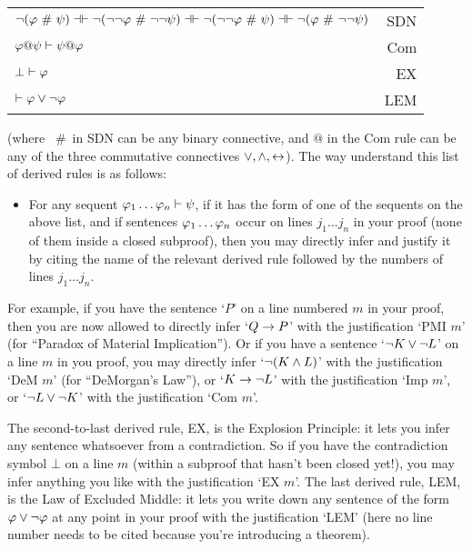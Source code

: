 \begin{center}
\begin{tabular}{l  r}
$\enot (\meta{\varphi}  \ \#\  \meta{\psi}) \pequiv \enot (\enot \enot \meta{\varphi}  \ \#\   \enot \enot \meta{\psi}) \pequiv \enot (\enot \enot \meta{\varphi}  \ \#\  \meta{\psi}) \pequiv \enot (\meta{\varphi}  \ \#\  \enot \enot  \meta{\psi})$ & SDN\\
$\mathcal{\varphi} @ \mathcal{\psi}  \vdash  \mathcal{\psi} @ \mathcal{\varphi}$ &                          Com \\
$\bot \vdash \mathcal{\varphi}$ & EX \\
 $\vdash \mathcal{\varphi}\vee \neg \mathcal{\varphi}$ &                                                    LEM \\
\end{tabular}
\end{center}

\noindent (where  \ \#\  in SDN can be any binary connective, and $@$ in the Com rule can be any of the three commutative connectives $\vee, \wedge, \leftrightarrow$).  The way understand this list of derived rules is as follows:

\begin{itemize}
\item For any sequent $\mathcal{\varphi}_1 \ldots \mathcal{\varphi}_n \vdash \mathcal{\psi}$, if it has the form of one of the sequents on the above list, and if sentences $\mathcal{\varphi}_1 \ldots \mathcal{\varphi}_n$ occur on lines $j_1 \ldots j_n$ in your proof (none of them inside a closed subproof), then you may directly infer \meta{\chi} and justify it by citing the name of the relevant derived rule followed by the numbers of lines $j_1 \ldots j_n$.
\end{itemize}
For example, if you have the sentence `$P$' on a line numbered $m$ in your proof, then you are now allowed to directly infer `$Q \rightarrow P$' with the justification `PMI $m$' (for ``Paradox of Material Implication'').   Or if you have a sentence `$\neg K \vee \neg L$' on a line $m$ in you proof, you may directly infer `$\neg(K \wedge L)$' with the justification `DeM $m$' (for ``DeMorgan's Law''), or `$K \rightarrow \neg L$' with the justification `Imp $m$', or `$\neg L \vee \neg K$' with the justification `Com $m$'.

The second-to-last derived rule, EX, is the Explosion Principle: it lets you infer any sentence whatsoever from a contradiction.  So if you have the contradiction symbol $\bot$ on a line $m$ (within a subproof that hasn't been closed yet!), you may infer anything you like with the justification `EX $m$'.  The last derived rule, LEM, is the Law of Excluded Middle: it lets you write down any sentence of the form $\mathcal{\varphi} \vee \neg \mathcal{\varphi}$ at any point in your proof with the justification `LEM' (here no line number needs to be cited because you're introducing a theorem).

